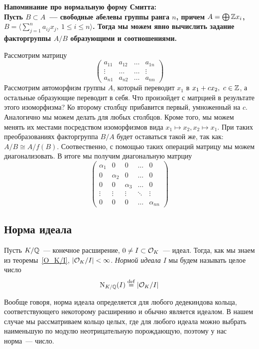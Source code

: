 	
	\noindent\bf{Напоминание про нормальную форму Смитта:}\hypertarget{smith_normal_form}{}\\
	Пусть $B \subset A$~--- свободные абелевы группы ранга $n$, причем $A = \bigoplus \mathbb{Z} x_{i}$, $B = \langle \sum_{j = 1}^{n} a_{i j} x_{j}, \ 1 \le i \le n \rangle$.  Тогда мы можем явно вычислить задание факторгруппы $A/B$ образующими и соотношениями. 

	Рассмотрим матрицу 
	\[
		\begin{pmatrix} a_{11} & a_{12} & \ldots & a_{1n} \\ \vdots & \ldots & \ldots & \vdots \\ a_{n 1} & a_{n 2} & \ldots & a_{n n} \end{pmatrix}
	\]
	Рассмотрим автоморфизм группы $A$, который переводит $x_{1}$ в $x_{1} + c x_{2}, \ c \in \mathbb{Z}$, а остальные образующие переводит в себя. 
	Что произойдет с матрцией в результате этого изоморфизма?  Ко второму столбцу прибавится первый, умноженный на $c$.  Аналогично мы можем делать для любых столбцов. Кроме того, мы можем менять их местами посредством изоморфизмов вида $x_{1} \mapsto x_{2}, x_{2} \mapsto x_{1}$. При таких преобразованиях факторгруппа $B/A$ будет оставаться такой же, так как: $A/B \cong A / f(B)$. Соотвественно, с помощью таких операций матрицу мы можем диагонализовать. В итоге мы получим диагональную матрциу 
	\[
		\begin{pmatrix} \alpha_{1} & 0 & 0 & \ldots & 0 \\ 0 & \alpha_{2} & 0 & \ldots & 0 \\ 0 & 0 & \alpha_{3} & \ldots &  0  \\ \vdots & \vdots & \vdots & \ddots & \vdots  \\ 0 & 0 & 0 & \ldots & \alpha_{nn}\end{pmatrix}
	\]

	\subsection{Норма идеала}

	\begin{definition} 
		Пусть $K/\mathbb{Q}$~--- конечное расширение, $0 \neq I \subset \mathcal{O}_{K}$~--- идеал. Тогда, как мы знаем из теоремы~\ref{O_K/I}, $|\mathcal{O}_{K}/I| < \infty$. \emph{Нормой идеала $I$} мы будем называть целое число
		\[
			\mathrm{N}_{K/\Q}\lr*{I} \eqdef \left\lvert \cO_{K} / I \right\rvert
		\]
	\end{definition}

	\begin{remark}
		Вообще говоря, норма идеала определяется для любого дедекиндова кольца, соответствующего некоторому расширению и обычно является идеалом. В нашем случае мы рассматриваем кольцо целых, где для любого идеала можно выбрать наименьшую по модулю неотрицательную порождающую, поэтому у нас норма~--- число. 
	\end{remark}

